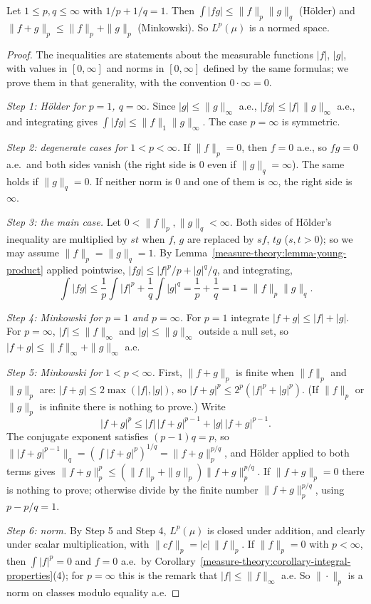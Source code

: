\begin{proposition}\label{measure-theory:proposition-holder}
Let $1 \leq p, q \leq \infty$ with $1/p + 1/q = 1$. Then $\int|fg| \leq \|f\|_p\|g\|_q$ (H\"older) and $\|f + g\|_p \leq \|f\|_p + \|g\|_p$ (Minkowski). So $L^p(\mu)$ is a normed space.
\end{proposition}

\begin{proof}
The inequalities are statements about the measurable functions $|f|$, $|g|$, with values in $[0, \infty]$ and norms in $[0, \infty]$ defined by the same formulas; we prove them in that generality, with
the convention $0 \cdot \infty = 0$.

\emph{Step 1: H\"older for $p = 1$, $q = \infty$.} Since $|g| \leq \|g\|_\infty$ a.e., $|fg| \leq |f|\,\|g\|_\infty$ a.e., and integrating gives $\int|fg| \leq \|f\|_1\|g\|_\infty$. The case $p = \infty$ is symmetric.

\emph{Step 2: degenerate cases for $1 < p < \infty$.} If $\|f\|_p = 0$, then $f = 0$ a.e., so $fg = 0$ a.e.\ and both sides vanish (the right side is $0$ even if $\|g\|_q = \infty$). The same holds if
$\|g\|_q = 0$. If neither norm is $0$ and one of them is $\infty$, the right side is $\infty$.

\emph{Step 3: the main case.} Let $0 < \|f\|_p, \|g\|_q < \infty$. Both sides of H\"older's inequality are multiplied by $st$ when $f$, $g$ are replaced by $sf$, $tg$ ($s, t > 0$); so we may assume
$\|f\|_p = \|g\|_q = 1$. By Lemma~\ref{measure-theory:lemma-young-product} applied pointwise, $|fg| \leq |f|^p/p + |g|^q/q$, and integrating,
\[
\int|fg| \leq \frac1p\int|f|^p + \frac1q\int|g|^q = \frac1p + \frac1q = 1 = \|f\|_p\|g\|_q.
\]

\emph{Step 4: Minkowski for $p = 1$ and $p = \infty$.} For $p = 1$ integrate $|f + g| \leq |f| + |g|$. For $p = \infty$, $|f| \leq \|f\|_\infty$ and $|g| \leq \|g\|_\infty$ outside a null set, so
$|f + g| \leq \|f\|_\infty + \|g\|_\infty$ a.e.

\emph{Step 5: Minkowski for $1 < p < \infty$.} First, $\|f + g\|_p$ is finite when $\|f\|_p$ and $\|g\|_p$ are: $|f + g| \leq 2\max(|f|, |g|)$, so $|f + g|^p \leq 2^p(|f|^p + |g|^p)$. (If $\|f\|_p$ or
$\|g\|_p$ is infinite there is nothing to prove.) Write
\[
|f + g|^p \leq |f|\,|f + g|^{p-1} + |g|\,|f + g|^{p-1}.
\]
The conjugate exponent satisfies $(p - 1)q = p$, so $\||f + g|^{p-1}\|_q = (\int|f + g|^p)^{1/q} = \|f + g\|_p^{p/q}$, and H\"older applied to both terms gives
$\|f + g\|_p^p \leq (\|f\|_p + \|g\|_p)\|f + g\|_p^{p/q}$. If $\|f + g\|_p = 0$ there is nothing to prove; otherwise divide by the finite number $\|f + g\|_p^{p/q}$, using $p - p/q = 1$.

\emph{Step 6: norm.} By Step 5 and Step 4, $L^p(\mu)$ is closed under addition, and clearly under scalar multiplication, with $\|cf\|_p = |c|\,\|f\|_p$. If $\|f\|_p = 0$ with $p < \infty$, then $\int|f|^p = 0$
and $f = 0$ a.e.\ by Corollary~\ref{measure-theory:corollary-integral-properties}(4); for $p = \infty$ this is the remark that $|f| \leq \|f\|_\infty$ a.e. So $\|\cdot\|_p$ is a norm on classes modulo
equality a.e.
\end{proof}

